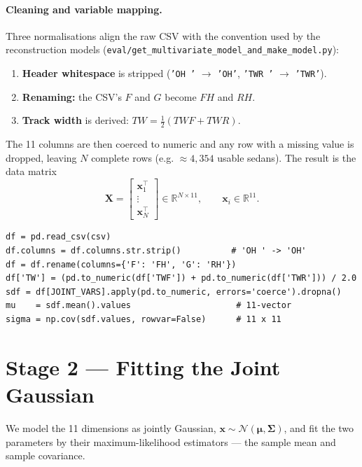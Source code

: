 \documentclass[11pt]{article}
\newcommand{\TW}{\mathit{TW}}
\newcommand{\FH}{\mathit{FH}}
\newcommand{\RH}{\mathit{RH}}
\newcommand{\Norm}{\mathcal{N}}
\newcommand{\bmu}{\boldsymbol{\mu}}
\newcommand{\bSigma}{\boldsymbol{\Sigma}}
\newcommand{\bx}{\mathbf{x}}
\newcommand{\bX}{\mathbf{X}}
\newcommand{\T}{^{\!\top}}
\theoremstyle{definition}
\begin{document}
\paragraph{Cleaning and variable mapping.} Three normalisations align the raw CSV with the convention used by the reconstruction models (\texttt{eval/get\_multivariate\_model\_and\_make\_model.py}):
\begin{enumerate}[leftmargin=2em]
  \item \textbf{Header whitespace} is stripped (\texttt{'OH '} $\to$ \texttt{'OH'}, \texttt{'TWR '} $\to$ \texttt{'TWR'}).
  \item \textbf{Renaming:} the CSV's $F$ and $G$ become $\FH$ and $\RH$.
  \item \textbf{Track width} is derived: $\TW=\tfrac{1}{2}(TWF+TWR)$.
\end{enumerate}
The 11 columns are then coerced to numeric and any row with a missing value is dropped, leaving $N$ complete rows (e.g. $\approx 4{,}354$ usable sedans). The result is the data matrix
\begin{equation}
\bX=\begin{bmatrix} \bx_1\T \\ \vdots \\ \bx_N\T \end{bmatrix}\in\mathbb{R}^{N\times 11},
\qquad \bx_i\in\mathbb{R}^{11}.
\end{equation}

\begin{lstlisting}[caption={Data preparation (\texttt{build\_joint\_gaussian}).}]
df = pd.read_csv(csv)
df.columns = df.columns.str.strip()          # 'OH ' -> 'OH'
df = df.rename(columns={'F': 'FH', 'G': 'RH'})
df['TW'] = (pd.to_numeric(df['TWF']) + pd.to_numeric(df['TWR'])) / 2.0
sdf = df[JOINT_VARS].apply(pd.to_numeric, errors='coerce').dropna()
mu    = sdf.mean().values                     # 11-vector
sigma = np.cov(sdf.values, rowvar=False)      # 11 x 11
\end{lstlisting}

\section{Stage 2 --- Fitting the Joint Gaussian}

We model the 11 dimensions as jointly Gaussian, $\bx\sim\Norm(\bmu,\bSigma)$, and fit the two parameters by their maximum-likelihood estimators --- the sample mean and sample covariance.
\end{document}
